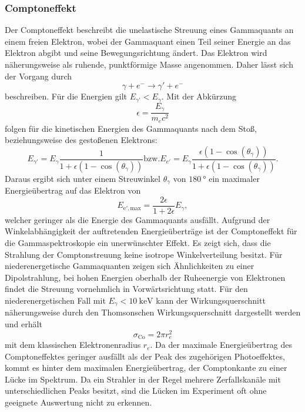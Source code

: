 \subsubsection{Comptoneffekt}
Der Comptoneffekt beschreibt die unelastische Streuung eines Gammaquants an einem freien Elektron, wobei der Gammaquant einen Teil seiner Energie an das Elektron abgibt und seine Bewegungsrichtung ändert. Das Elektron wird näherungsweise als ruhende, punktförmige Masse angenommen. Daher lässt sich der Vorgang durch
\begin{equation}
    \gamma + e^- \to \gamma' + e^-
\end{equation}
beschreiben. Für die Energien gilt $E_{\gamma'} < E_\gamma$.
Mit der Abkürzung
\begin{equation}
    \epsilon = \frac{E_\gamma}{m_e c^2}
\end{equation}
folgen für die kinetischen Energien des Gammaquants nach dem Stoß, beziehungsweise des gestoßenen Elektrons:
\begin{equation}
    E_{\gamma'} =  E_\gamma \frac{1}{1+ \epsilon (1-\cos(\theta_\gamma))} \text{bzw.} E_{e'} =  E_\gamma \frac{\epsilon (1-\cos(\theta_\gamma))}{1+ \epsilon (1-\cos(\theta_\gamma))} .
\end{equation}
Daraus ergibt sich unter einem Streuwinkel $\theta_\gamma$ von $\SI{180}{\degree}$ ein maximaler Energieübertrag auf das Elektron von
\begin{equation}
    E_{\text{e}',\text{max}} = \frac{2 \epsilon}{1 + 2 \epsilon} E_\gamma ,
\end{equation}
welcher geringer als die Energie des Gammaquants ausfällt. %
Aufgrund der Winkelabhängigkeit der auftretenden Energieüberträge ist der Comptoneffekt für die Gammaspektroskopie ein unerwünschter Effekt. Es zeigt sich, dass die Strahlung der Comptonstreuung keine isotrope Winkelverteilung besitzt. Für niederenergetische Gammaquanten zeigen sich Ähnlichkeiten zu einer Dipolstrahlung, bei hohen Energien oberhalb der Ruheenergie von Elektronen findet die Streuung vornehmlich in Vorwärtsrichtung statt. Für den niederenergetischen Fall mit $E_\gamma < \SI{10}{\kilo\electronvolt}$ kann der Wirkungsquerschnitt näherungsweise durch den Thomsonschen Wirkungsquerschnitt dargestellt werden und erhält
\begin{equation}
    \sigma_\text{Co} = 2 \pi r_e^2
\end{equation}
mit dem klassischen Elektronenradius $r_e$. Da der maximale Energieübertrag des Comptoneffektes geringer ausfällt als der Peak des zugehörigen Photoeffektes, kommt es hinter dem maximalen Energieübertrag, der Comptonkante zu einer Lücke im Spektrum. Da ein Strahler in der Regel mehrere Zerfallskanäle mit unterschiedlichen Peaks besitzt, sind die Lücken im Experiment oft ohne geeignete Auswertung nicht zu erkennen.%

